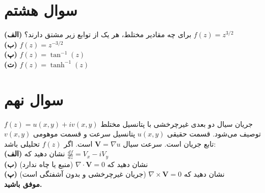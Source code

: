 \documentclass[a4paper,16pt]{article}
\begin{document}
	\section{سوال هشتم}
	 برای چه مقادیر مختلط، هر یک از توابع زیر مشتق دارند؟  
	\textbf{(الف)} \( f(z) = z^{3/2} \)  
	\\
	\textbf{(ب)} \( f(z) = z^{-3/2} \)  
	\\
	\textbf{(پ)} \( f(z) = \tan^{-1}(z) \) 
	\\ 
	\textbf{(ت)} \( f(z) = \tanh^{-1}(z) \)

	\section{سوال نهم}
	 جریان سیال دو بعدی غیرچرخشی با پتانسیل مختلط \( f(z) = u(x,y) + i v(x,y) \) توصیف می‌شود. قسمت حقیقی \( u(x,y) \) پتانسیل سرعت و قسمت موهومی \( v(x,y) \) تابع جریان است. سرعت سیال \( \mathbf{V} = \nabla u \) است. اگر \( f(z) \) تحلیلی باشد:  
	 \\
	\textbf{(الف)} نشان دهید که \( \frac{df}{dz} = V_x - i V_y \)  
	\\
	\textbf{(ب)} نشان دهید که \( \nabla \cdot \mathbf{V} = 0 \) (منبع یا چاه ندارد)  
	\\
	\textbf{(پ)} نشان دهید که \( \nabla \times \mathbf{V} = 0 \) (جریان غیرچرخشی و بدون آشفتگی است)
	\\
	\vspace{10pt}
	\textbf{موفق باشید.}
\end{document}
